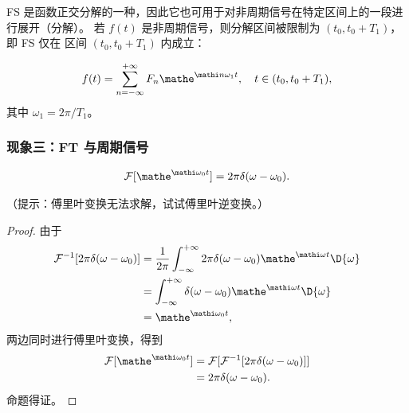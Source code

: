 FS 是函数正交分解的一种，因此它也可用于对非周期信号在特定区间上的一段进行展开（分解）。
若 $f(t)$ 是非周期信号，则分解区间被限制为 $(t_0, t_0 + T_1)$，即 FS 仅在
区间 $(t_0, t_0 + T_1)$ 内成立：

\begin{align*}
    f(t) = \sum_{n = -\infty}^{+\infty} F_n\mathe^{\mathi n\omega_1 t}, \quad t \in (t_0, t_0 + T_1),
\end{align*}
其中 $\omega_1 = 2\pi / T_1$。

\subsubsection{现象三：FT 与周期信号}

\begin{theorem}
    \begin{align*}
        \mathcal{F}[\mathe^{\mathi \omega_0 t}] = 2\pi\delta(\omega - \omega_0).
    \end{align*}
\end{theorem}

\begin{note}
    （提示：傅里叶变换无法求解，试试傅里叶逆变换。）
\end{note}

\begin{proof}
    由于
    \begin{align*}
        \mathcal{F}^{-1}[2\pi\delta(\omega - \omega_0)] & = \frac{1}{2\pi}\int_{-\infty}^{+\infty}2\pi\delta(\omega - \omega_0)\mathe^{\mathi\omega t}\D{\omega} \\
        & = \int_{-\infty}^{+\infty}\delta(\omega - \omega_0)\mathe^{\mathi\omega t}\D{\omega} \\
        & = \mathe^{\mathi\omega_0 t},
    \end{align*}
    两边同时进行傅里叶变换，得到
    \begin{align*}
        \mathcal{F}[\mathe^{\mathi \omega_0 t}] & = \mathcal{F}[\mathcal{F}^{-1}[2\pi\delta(\omega - \omega_0)]] \\
        & = 2\pi\delta(\omega - \omega_0).
    \end{align*}
    命题得证。
\end{proof}

